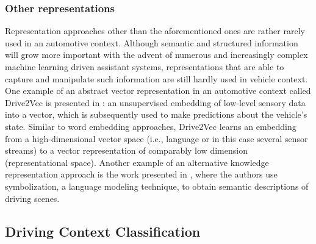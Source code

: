 \subsubsection{Other representations}

Representation approaches other than the aforementioned ones are rather rarely used in an automotive context.
Although semantic and structured information will grow more important with the advent of numerous and increasingly complex machine learning driven assistant systems, representations that are able to capture and manipulate such information are still hardly used in vehicle context.
One example of an abstract vector representation in an automotive context called Drive2Vec is presented in \textcite{Hallac2018}: an unsupervised embedding of low-level sensory data into a vector, which is subsequently used to make predictions about the vehicle's state.
Similar to word embedding approaches, Drive2Vec learns an embedding from a high-dimensional vector space (i.e., language or in this case several sensor streams) to a vector representation of comparably low dimension (representational space).
Another example of an alternative knowledge representation approach is the work presented in \textcite{Yamazaki2016}, where the authors use symbolization, a language modeling technique, to obtain semantic descriptions of driving scenes.

\subsection{Driving Context Classification}%
\label{subsec:driving_context_classification}

